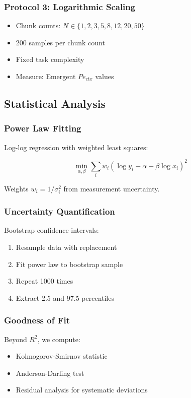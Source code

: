 \documentclass[conference]{IEEEtran}
\begin{document}
\subsubsection{Protocol 3: Logarithmic Scaling}

\begin{itemize}
\item Chunk counts: $N \in \{1, 2, 3, 5, 8, 12, 20, 50\}$
\item 200 samples per chunk count
\item Fixed task complexity
\item Measure: Emergent $Pe_{ctx}$ values
\end{itemize}

\subsection{Statistical Analysis}

\subsubsection{Power Law Fitting}

Log-log regression with weighted least squares:

\begin{equation}
\min_{\alpha, \beta} \sum_{i} w_i(\log y_i - \alpha - \beta \log x_i)^2
\end{equation}

Weights $w_i = 1/\sigma_i^2$ from measurement uncertainty.

\subsubsection{Uncertainty Quantification}

Bootstrap confidence intervals:
\begin{enumerate}
\item Resample data with replacement
\item Fit power law to bootstrap sample
\item Repeat 1000 times
\item Extract 2.5 and 97.5 percentiles
\end{enumerate}

\subsubsection{Goodness of Fit}

Beyond $R^2$, we compute:
\begin{itemize}
\item Kolmogorov-Smirnov statistic
\item Anderson-Darling test
\item Residual analysis for systematic deviations
\end{itemize}
\end{document}
